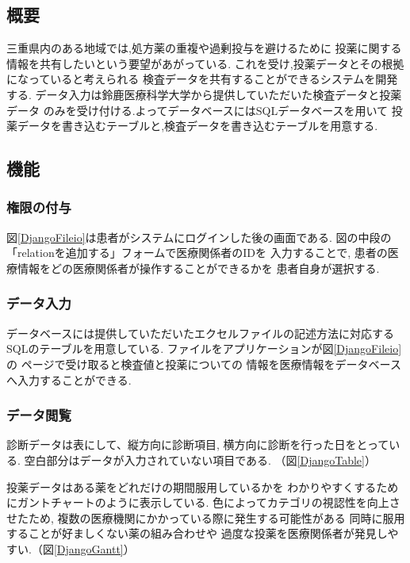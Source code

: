 \subsection{概要}
三重県内のある地域では,処方薬の重複や過剰投与を避けるために
投薬に関する情報を共有したいという要望があがっている.
これを受け,投薬データとその根拠になっていると考えられる
検査データを共有することができるシステムを開発する.
データ入力は鈴鹿医療科学大学から提供していただいた検査データと投薬データ
のみを受け付ける.よってデータベースにはSQLデータベースを用いて
投薬データを書き込むテーブルと,検査データを書き込むテーブルを用意する.

\subsection{機能}
  \subsubsection{権限の付与}
    図\ref{DjangoFileio}は患者がシステムにログインした後の画面である.
    図の中段の「relationを追加する」フォームで医療関係者のIDを
    入力することで,
    患者の医療情報をどの医療関係者が操作することができるかを
    患者自身が選択する.


  \subsubsection{データ入力}
    データベースには提供していただいたエクセルファイルの記述方法に対応する
    SQLのテーブルを用意している.
    ファイルをアプリケーションが図\ref{DjangoFileio}の
    ページで受け取ると検査値と投薬についての
    情報を医療情報をデータベースへ入力することができる.

  \subsubsection{データ閲覧}
    診断データは表にして、縦方向に診断項目,
    横方向に診断を行った日をとっている.
    空白部分はデータが入力されていない項目である.
    （図\ref{DjangoTable}）


    投薬データはある薬をどれだけの期間服用しているかを
    わかりやすくするためにガントチャートのように表示している.
    色によってカテゴリの視認性を向上させたため,
    複数の医療機関にかかっている際に発生する可能性がある
    同時に服用することが好ましくない薬の組み合わせや
    過度な投薬を医療関係者が発見しやすい.（図\ref{DjangoGantt}）



